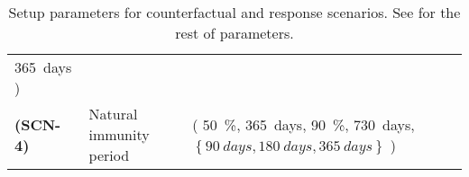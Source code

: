 \begin{table*}[tbh]
\begin{tabular}{%
                >{\centering}
                p{}
                p{}
                p{}
            }
            \SI{365}{days}%
            )
            \\
            \textbf{(SCN-4)}
            &
            Natural immunity period
            &
            (%
            \SI{50}{\percent}, %
            \SI{365}{days}, %
            \SI{90}{\percent}, %
            \SI{730}{days}, %
            $
            \left\{
                \SI{90}{days},
                \SI{180}{days},
                \SI{365}{days}
            \right\}
            $%
            )
            \\
            \bottomrule
        \end{tabular}
        \caption{
            Setup parameters for counterfactual and response scenarios. See
             for the rest of parameters.}
        \label{tbl:scene_parameters}
    \end{table*}
%

